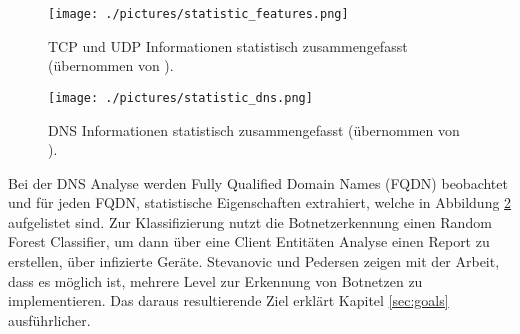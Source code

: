 \begin{figure}[!ht]
    \centering
    \texttt{[image: ./pictures/statistic\_features.png]}
    \caption{TCP und UDP Informationen statistisch zusammengefasst (übernommen von \cite{DBLP:journals/ijcysa/StevanovicP16}).}
    \label{fig:stats_features}
\end{figure}

\begin{figure}[!ht]
    \centering
    \texttt{[image: ./pictures/statistic\_dns.png]}
    \caption{DNS Informationen statistisch zusammengefasst (übernommen von \cite{DBLP:journals/ijcysa/StevanovicP16}).}
    \label{fig:stats_dns}
\end{figure}

Bei der DNS Analyse werden Fully Qualified Domain Names (FQDN) beobachtet und für jeden FQDN, statistische Eigenschaften extrahiert, welche in Abbildung \ref{fig:stats_dns} aufgelistet sind. Zur 
Klassifizierung nutzt die Botnetzerkennung einen Random Forest Classifier, um dann über eine Client Entitäten Analyse einen Report zu erstellen, über infizierte Geräte. Stevanovic und Pedersen
zeigen mit der Arbeit, dass es möglich ist, mehrere Level zur Erkennung von Botnetzen zu implementieren. Das daraus resultierende Ziel erklärt Kapitel \ref{sec:goals} ausführlicher.

